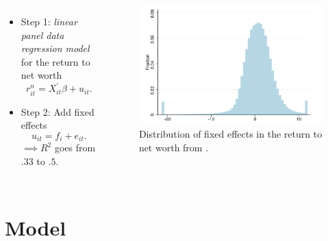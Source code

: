 \documentclass{beamer}
\begin{document}
\begin{frame}{}
   
     \begin{columns}
     \small
    \centering
    
    \begin{itemize}
    \item Step 1: \textit{linear panel data regression model} for the return to net worth
    $$ r^{n}_{it} = X^{'}_{it} \beta + u_{it}. $$
    \item Step 2: Add fixed effects 
    $$ u_{it} = f_{i} + e_{it}. $$
    $\implies R^2$ goes from $.33$ to $.5$.
    \end{itemize}
    
    
    \centering
    \begin{figure}
    \includegraphics[width=\textwidth]{Figures/Fagereng2020Fig8.png}
    \captionsetup{font=scriptsize}
    \caption{Distribution of fixed effects in the return to net worth from \cite{aflgdmlp20}.}
    \end{figure}
  \end{columns}
   
\end{frame}

\section{Model}
\end{document}
